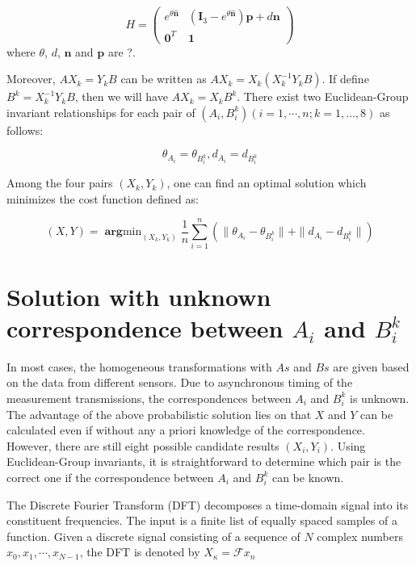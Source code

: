 \documentclass[letterpaper, 10 pt, conference]{ieeeconf}  %
\begin{document}
\begin{equation}\label{equ21}
H = \left( \begin{array}{cc}
       e^{\theta \hat{\mathbf{n}}} & (\mathbf{I}_{3} - e^{\theta \hat{\mathbf{n}}})\mathbf{p} + d\mathbf{n} \\
       \mathbf{0}^{T} & \mathbf{1}
\end{array} \right)
\end{equation}
where $\theta$, $d$, $\mathbf{n}$ and $\mathbf{p}$ are ?.

Moreover, $AX_k = Y_k B$ can be written as $AX_k=X_k(X_k^{-1}Y_kB)$. If define $B^k = X_k^{-1}Y_kB$, then we will have $AX_k=X_kB^k$. There exist two Euclidean-Group invariant relationships for each pair of $(A_{i},B_{i}^k)( i = 1,\cdots,n; k=1,\dots,8)$ as follows:

\begin{equation}\label{equ22}
    \theta_{A_{i}}=\theta_{B_{i}^{k}}, d_{A_{i}}=d_{B_{i}^{k}}
\end{equation}

Among the four pairs $(X_{k},Y_{k})$, one can find an optimal solution which  minimizes the cost function defined as:

\begin{equation}\label{equ23}
    (X,Y) = \mathop{\mathbf{arg}min}_{(X_{k},Y_{k})}\frac{1}{n} \sum_{i=1}^{n} (\parallel \theta_{A_{i}}-\theta_{B_{i}^{k}} \parallel + \parallel d_{A_{i}}-d_{B_{i}^{k}} \parallel)
\end{equation}

\section{Solution with unknown correspondence between $A_{i}$ and $B_{i}^{k}$}
\label{sect3}

In most cases, the homogeneous transformations with $As$ and $Bs$ are given based on the data from different sensors. Due to asynchronous timing of the measurement transmissions, the correspondences between $A_{i}$ and $B_{i}^{k}$ is unknown. The advantage of the above probabilistic solution lies on that $X$ and $Y$ can be calculated even if without any a priori knowledge of the correspondence. However, there are still eight possible candidate results $(X_{i},Y_{i})$. Using Euclidean-Group invariants, it is straightforward to determine which pair is the correct one if the correspondence between $A_{i}$ and $B_{i}^{k}$ can be known.

The Discrete Fourier Transform (DFT) decomposes a time-domain signal into its constituent frequencies. The input is a finite list of equally spaced samples of a function. Given a discrete signal consisting of a sequence of $N$ complex numbers $x_{0},x_{1},\cdots,x_{N-1}$, the DFT is denoted by $X_{\kappa} = \mathcal{F}{x_{n}}$
\end{document}
